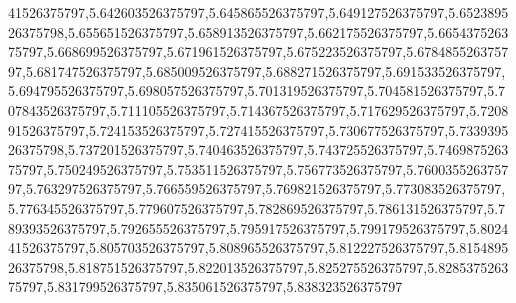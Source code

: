 41526375797,5.642603526375797,5.645865526375797,5.649127526375797,5.652389526375798,5.655651526375797,5.658913526375797,5.662175526375797,5.665437526375797,5.668699526375797,5.671961526375797,5.675223526375797,5.678485526375797,5.681747526375797,5.685009526375797,5.688271526375797,5.691533526375797,5.694795526375797,5.698057526375797,5.701319526375797,5.704581526375797,5.707843526375797,5.711105526375797,5.714367526375797,5.717629526375797,5.720891526375797,5.724153526375797,5.727415526375797,5.730677526375797,5.733939526375798,5.737201526375797,5.740463526375797,5.743725526375797,5.746987526375797,5.750249526375797,5.753511526375797,5.756773526375797,5.760035526375797,5.763297526375797,5.766559526375797,5.769821526375797,5.773083526375797,5.776345526375797,5.779607526375797,5.782869526375797,5.786131526375797,5.789393526375797,5.792655526375797,5.795917526375797,5.799179526375797,5.802441526375797,5.805703526375797,5.808965526375797,5.812227526375797,5.815489526375798,5.818751526375797,5.822013526375797,5.825275526375797,5.828537526375797,5.831799526375797,5.835061526375797,5.838323526375797
